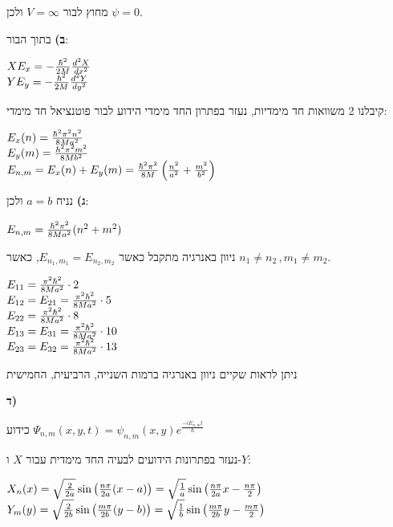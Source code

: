 \documentclass[14pt]{extarticle}
\makeatletter
\newenvironment{lefteqs}{%
    \begin{english}%
    \begin{flushleft}%
    \renewcommand{\arraystretch}{1.3}%
    $\begin{array}{@{}l@{}}%
}{%
    \end{array}$%
    \end{flushleft}%
    \end{english}%
}
\makeatother
\begin{document}
מחוץ לבור $V=\infty$ ולכן $\psi=0$.

\textbf{ב)}
בתוך הבור:
\begin{lefteqs}
    X E_x = -\frac{\hbar^2}{2M} \frac{d^2 X}{dx^2} \\
    Y E_y = -\frac{\hbar^2}{2M} \frac{d^2 Y}{dy^2}
\end{lefteqs}

קיבלנו 2 משוואות חד מימדיות, נעזר בפתרון החד מימדי הידוע לבור פוטנציאל חד מימדי:

\begin{lefteqs}
    E_x(n) = \frac{\hbar^2 \pi^2 n^2}{8 M a^2} \\
    E_y(m) = \frac{\hbar^2 \pi^2 m^2}{8 M b^2} \\
    E_{n,m} = E_x(n) + E_y(m) = \frac{\hbar^2 \pi^2}{8 M} \left( \frac{n^2}{a^2} + \frac{m^2}{b^2} \right)
\end{lefteqs}

\textbf{ג)}
נניח $a=b$ ולכן:

\begin{lefteqs}
    E_{n,m} = \frac{\hbar^2 \pi^2}{8 M a^2} ( n^2 + m^2 )
\end{lefteqs}

ניוון באנרגיה מתקבל כאשר $E_{n_1,m_1} = E_{n_2,m_2}$, כאשר $n_1 \neq n_2\, , m_1 \neq m_2$.

\begin{lefteqs}
    E_{11} = \frac{\pi^2 \hbar^2}{8M a^2} \cdot 2 \\
    E_{12} = E_{21} = \frac{\pi^2 \hbar^2}{8M a^2} \cdot 5 \\
    E_{22} = \frac{\pi^2 \hbar^2}{8M a^2} \cdot 8 \\
    E_{13} = E_{31} = \frac{\pi^2 \hbar^2}{8M a^2} \cdot 10 \\
    E_{23} = E_{32} = \frac{\pi^2 \hbar^2}{8M a^2} \cdot 13
\end{lefteqs}

ניתן לראות שקיים ניוון באנרגיה ברמות השנייה, הרביעית, החמישית

\textbf{ד)}

כידוע $\Psi_{n,m}(x,y,t) = \psi_{n,m}(x,y) e^{\frac{-i E_{n,m} t}{\hbar}}$

נעזר בפתרונות הידועים לבעיה החד מימדית עבור $X$ ו-$Y$:

\begin{lefteqs}
    X_n(x) = \sqrt{\frac{2}{2a}} \sin \left( \frac{n\pi}{2a}(x-a) \right) = \sqrt{\frac{1}{a}} \sin\left(\frac{n\pi}{2a}x - \frac{n\pi}{2}\right) \\
    Y_m(y) = \sqrt{\frac{2}{2b}} \sin \left( \frac{m\pi}{2b}(y-b) \right) = \sqrt{\frac{1}{b}} \sin\left(\frac{m\pi}{2b}y - \frac{m\pi}{2}\right)
\end{lefteqs}
\end{document}
